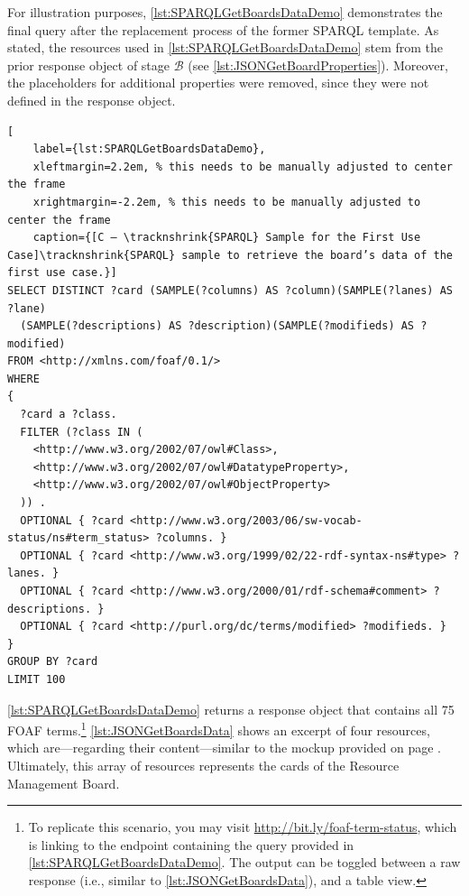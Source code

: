\noindent For illustration purposes, \autoref{lst:SPARQLGetBoardsDataDemo} demonstrates the final query after the replacement process of the former \acrshort*{SPARQL} template. As stated, the resources used in \autoref{lst:SPARQLGetBoardsDataDemo} stem from the prior response object of stage {\small \hyperref[ssec:QS-B]{\(\mathcal{B}\)}} (see \autoref{lst:JSONGetBoardProperties}). Moreover, the placeholders for additional properties were removed, since they were not defined in the response object.

\begin{spacing}{0.9}
    \lstset{language=SPARQL,escapechar=|}
    \begin{lstlisting}[
    label={lst:SPARQLGetBoardsDataDemo},
    xleftmargin=2.2em, % this needs to be manually adjusted to center the frame
    xrightmargin=-2.2em, % this needs to be manually adjusted to center the frame
    caption={[C — \tracknshrink{SPARQL} Sample for the First Use Case]\tracknshrink{SPARQL} sample to retrieve the board’s data of the first use case.}]
SELECT DISTINCT ?card (SAMPLE(?columns) AS ?column)(SAMPLE(?lanes) AS ?lane)
  (SAMPLE(?descriptions) AS ?description)(SAMPLE(?modifieds) AS ?modified)
FROM <http://xmlns.com/foaf/0.1/>
WHERE
{
  ?card a ?class.
  FILTER (?class IN (
    <http://www.w3.org/2002/07/owl#Class>,
    <http://www.w3.org/2002/07/owl#DatatypeProperty>,
    <http://www.w3.org/2002/07/owl#ObjectProperty>
  )) .
  OPTIONAL { ?card <http://www.w3.org/2003/06/sw-vocab-status/ns#term_status> ?columns. }
  OPTIONAL { ?card <http://www.w3.org/1999/02/22-rdf-syntax-ns#type> ?lanes. }
  OPTIONAL { ?card <http://www.w3.org/2000/01/rdf-schema#comment> ?descriptions. }
  OPTIONAL { ?card <http://purl.org/dc/terms/modified> ?modifieds. }
}
GROUP BY ?card
LIMIT 100
\end{lstlisting}
\end{spacing}


\noindent \autoref{lst:SPARQLGetBoardsDataDemo} returns a response object that contains all 75 \acrshort*{FOAF} terms.\footnote{To replicate this scenario, you may visit \url{http://bit.ly/foaf-term-status}, which is linking to the  endpoint containing the query provided in \autoref{lst:SPARQLGetBoardsDataDemo}. The output can be toggled between a raw response (i.e., similar to \autoref{lst:JSONGetBoardsData}), and a table view.} \autoref{lst:JSONGetBoardsData} shows an excerpt of four resources, which are—regarding their content—similar to the mockup provided on page \pageref{fig:RMB Use Case 1}. Ultimately, this array of resources represents the cards of the Resource Management Board.

